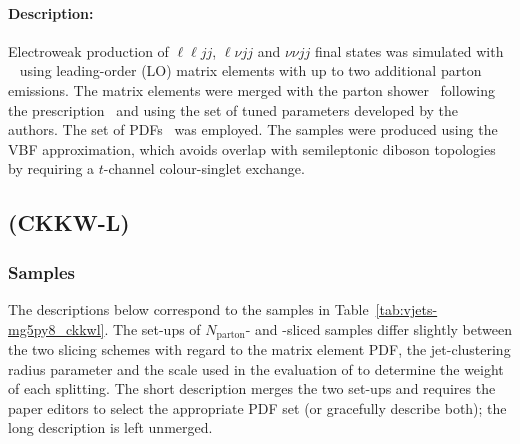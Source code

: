 \paragraph{Description:}

Electroweak production of $\ell\ell jj$, $\ell\nu jj$ and $\nu\nu jj$ final states
was simulated with \SHERPA[2.2.1]~\cite{Bothmann:2019yzt} using 
leading-order (LO) matrix elements with up to two additional parton emissions. 
The matrix elements were merged with the \SHERPA parton
shower~\cite{Schumann:2007mg} following the \MEPSatLO
prescription~\cite{Catani:2001cc} and using the set of tuned
parameters developed by the \SHERPA authors.  The \NNPDF[3.0nnlo] set of
PDFs~\cite{Ball:2014uwa} was employed. The samples were produced
using the VBF approximation, which avoids overlap  with semileptonic
diboson topologies by requiring a $t$-channel colour-singlet exchange.



\subsection[MadGraph5 (CKKW-L)]{\MADGRAPH (CKKW-L)}

\subsubsection*{Samples}

The descriptions below correspond to the samples in
Table~\ref{tab:vjets-mg5py8_ckkwl}. The set-ups of $N_\text{parton}$- and
\HT-sliced samples differ slightly between the two slicing schemes 
with regard to the matrix element PDF, the jet-clustering radius parameter 
and the scale used in the evaluation of  \alphas to determine the weight of
each splitting. The short description merges the two set-ups and requires 
the paper editors to select the appropriate PDF set (or gracefully describe 
both); the long description is left unmerged. 

